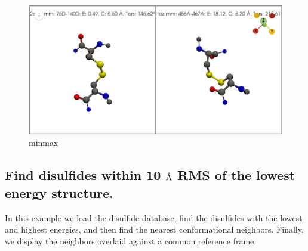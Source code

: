 \begin{Shaded}
\begin{Highlighting}[]

\OperatorTok{=}\OperatorTok{=}\OperatorTok{=}\NormalTok{)}


\OperatorTok{=}
\OperatorTok{=}\NormalTok{)}
\OperatorTok{=}\OperatorTok{=}\NormalTok{)}
\end{Highlighting}
\end{Shaded}

\begin{figure}
\centering
\includegraphics{minmax.png}
\caption{minmax}
\end{figure}

\hypertarget{find-disulfides-within-10-textnormalfontaa-rms-of-the-lowest-energy-structure.}{%
\subsection{\texorpdfstring{Find disulfides within 10
\(\text{\normalfont\AA}\) RMS of the lowest energy
structure.}{Find disulfides within 10 \textbackslash text\{\textbackslash normalfont\textbackslash AA\} RMS of the lowest energy structure.}}\label{find-disulfides-within-10-textnormalfontaa-rms-of-the-lowest-energy-structure.}}

In this example we load the disulfide database, find the disulfides with
the lowest and highest energies, and then find the nearest
conformational neighbors. Finally, we display the neighbors overlaid
against a common reference frame.

